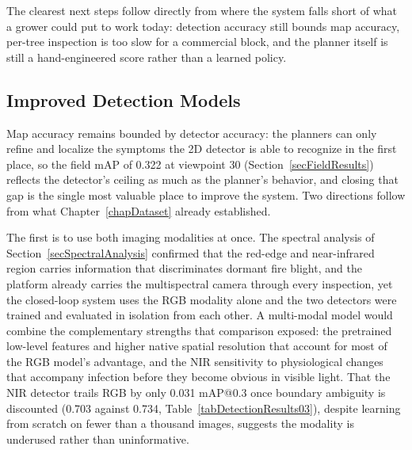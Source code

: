 The clearest next steps follow directly from where the system falls
short of what a grower could put to work today: detection accuracy still
bounds map accuracy, per-tree inspection is too slow for a commercial
block, and the planner itself is still a hand-engineered score rather
than a learned policy.

\subsection{Improved Detection Models} \label{secFutureDetection}

Map accuracy remains bounded by detector accuracy: the planners can only
refine and localize the symptoms the 2D detector is able to recognize in
the first place, so the field mAP of 0.322 at viewpoint 30
(Section~\ref{secFieldResults}) reflects the detector's ceiling as much
as the planner's behavior, and closing that gap is the single most
valuable place to improve the system. Two directions follow from what
Chapter~\ref{chapDataset} already established.

The first is to use both imaging modalities at once.
The spectral analysis of Section~\ref{secSpectralAnalysis} confirmed that
the red-edge and near-infrared region carries information that
discriminates dormant fire blight, and the platform already carries the
multispectral camera through every inspection, yet the closed-loop system
uses the RGB modality alone and the two detectors were trained and
evaluated in isolation from each other.
A multi-modal model would combine the complementary strengths that
comparison exposed: the pretrained low-level features and higher native
spatial resolution that account for most of the RGB model's advantage,
and the NIR sensitivity to physiological changes that accompany infection
before they become obvious in visible light.
That the NIR detector trails RGB by only 0.031 mAP@0.3 once boundary
ambiguity is discounted (0.703 against 0.734,
Table~\ref{tabDetectionResults03}), despite learning from scratch on fewer
than a thousand images, suggests the modality is underused rather than
uninformative.

